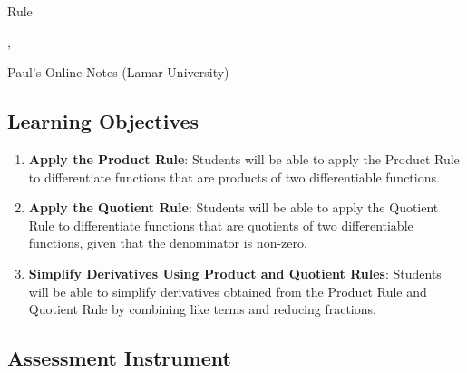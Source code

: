{{\begin{itemize}
    \item \href{https://tutorial.math.lamar.edu/classes/calci/productquotientrule.aspx}{Product and Quotient
\end{itemize}
    Rule},

    Paul's Online Notes (Lamar University)

\subsection{Learning Objectives}

\begin{enumerate}
    \item \textbf{Apply the Product Rule}: Students will be able to apply the Product Rule to differentiate functions that are products of two differentiable functions.
    \item \textbf{Apply the Quotient Rule}: Students will be able to apply the Quotient Rule to differentiate functions that are quotients of two differentiable functions, given that the denominator is non-zero.
    \item \textbf{Simplify Derivatives Using Product and Quotient Rules}: Students will be able to simplify derivatives obtained from the Product Rule and Quotient Rule by combining like terms and reducing fractions.
\end{enumerate}

\subsection{Assessment Instrument}

}
